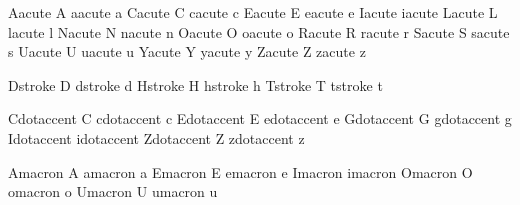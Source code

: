  Aacute {\buildtextaccent\textacute A}
 aacute {\buildtextaccent\textacute a}
 Cacute {\buildtextaccent\textacute C}
 cacute {\buildtextaccent\textacute c}
 Eacute {\buildtextaccent\textacute E}
 eacute {\buildtextaccent\textacute e}
 Iacute {\buildtextaccent\textacute \dotlessI}
 iacute {\buildtextaccent\textacute \dotlessi}
 Lacute {\buildtextaccent\textacute L}
 lacute {\buildtextaccent\textacute l}
 Nacute {\buildtextaccent\textacute N}
 nacute {\buildtextaccent\textacute n}
 Oacute {\buildtextaccent\textacute O}
 oacute {\buildtextaccent\textacute o}
 Racute {\buildtextaccent\textacute R}
 racute {\buildtextaccent\textacute r}
 Sacute {\buildtextaccent\textacute S}
 sacute {\buildtextaccent\textacute s}
 Uacute {\buildtextaccent\textacute U}
 uacute {\buildtextaccent\textacute u}
 Yacute {\buildtextaccent\textacute Y}
 yacute {\buildtextaccent\textacute y}
 Zacute {\buildtextaccent\textacute Z}
 zacute {\buildtextaccent\textacute z}

 Dstroke {D}
 dstroke {d}
 Hstroke {H}
 hstroke {h}
 Tstroke {T}
 tstroke {t}

 Cdotaccent {\buildtextaccent\textdotaccent C}
 cdotaccent {\buildtextaccent\textdotaccent c}
 Edotaccent {\buildtextaccent\textdotaccent E}
 edotaccent {\buildtextaccent\textdotaccent e}
 Gdotaccent {\buildtextaccent\textdotaccent G}
 gdotaccent {\buildtextaccent\textdotaccent g}
 Idotaccent {\buildtextaccent\textdotaccent \dotlessI}
 idotaccent {\buildtextaccent\textdotaccent \dotlessi}
 Zdotaccent {\buildtextaccent\textdotaccent Z}
 zdotaccent {\buildtextaccent\textdotaccent z}

 Amacron {\buildtextaccent\textmacron A}
 amacron {\buildtextaccent\textmacron a}
 Emacron {\buildtextaccent\textmacron E}
 emacron {\buildtextaccent\textmacron e}
 Imacron {\buildtextaccent\textmacron \dotlessI}
 imacron {\buildtextaccent\textmacron \dotlessi}
 Omacron {\buildtextaccent\textmacron O}
 omacron {\buildtextaccent\textmacron o}
 Umacron {\buildtextaccent\textmacron U}
 umacron {\buildtextaccent\textmacron u}

